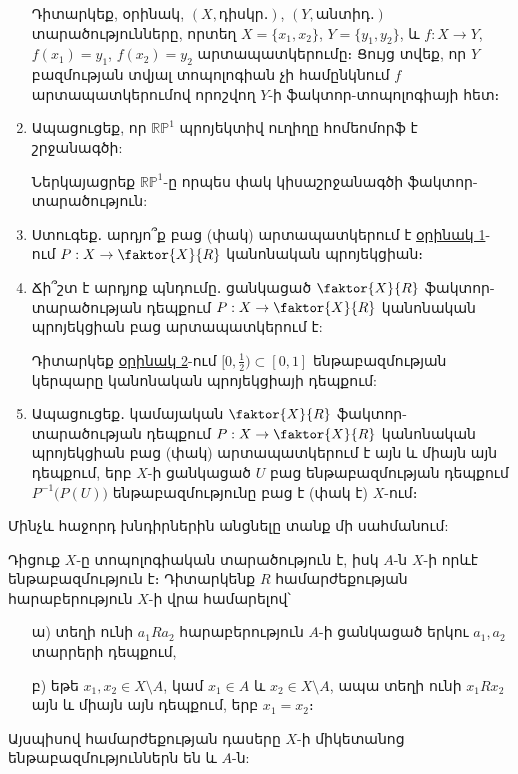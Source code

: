 \begin{enumerate}[label=\thesection.\arabic*., series=probset12]
\begin{hint}
Դիտարկեք, օրինակ, $(X, \text{դիսկր․})$, $(Y, \text{անտիդ․})$ տա\-րա\-ծու\-թյուն\-նե\-րը, որտեղ $X=\{x_1, x_2\}$, $Y=\{y_1, y_2\}$, և ${f: X \to Y}$, ${f(x_1)=y_1}$, ${f(x_2)=y_2}$ արտապատկերումը։ Ցույց տվեք, որ $Y$ բազմության տվյալ տոպոլոգիան չի համընկնում $f$ արտապատկերումով որոշվող $Y$-ի ֆակտոր-տոպոլոգիայի հետ։
\end{hint}

\item Ապացուցեք, որ $\mathbb{RP}^1$ պրոյեկտիվ ուղիղը հոմեոմորֆ է շրջանագծի:

\begin{hint}
Ներկայացրեք $\mathbb{RP}^1$-ը որպես փակ կիսաշրջանագծի ֆակտոր-տա\-րա\-ծություն:
\end{hint}

\item Ստուգեք․ արդյո՞ք բաց (փակ) արտապատկերում է \hyperref[ch12ex1]{օրինակ 1}-ում ${P: X \to \faktor{X}{R}}$ կանոնական պրոյեկցիան։

\item Ճի՞շտ է արդյոք պնդումը․ ցանկացած $\faktor{X}{R}$ ֆակտոր-տարածության դեպքում $P: X \to \faktor{X}{R}$ կանոնական պրոյեկցիան բաց արտապատկերում է:

\begin{hint}
Դիտարկեք \hyperref[ch12ex2]{օրինակ 2}-ում $[0, \frac{1}{2}) \subset [0, 1]$ ենթաբազմության կեր\-պարը կանոնական պրոյեկցիայի դեպքում:
\end{hint}

\item Ապացուցեք․ կամայական $\faktor{X}{R}$ ֆակտոր-տարածության դեպքում ${P: X \to \faktor{X}{R}}$ կանոնական պրոյեկցիան բաց (փակ) արտապատկերում է այն և միայն այն դեպքում, երբ $X$-ի ցանկացած $U$ բաց ենթաբազմության դեպքում $P^{-1}\big(P(U)\big)$ ենթաբազմությունը բաց է (փակ է) $X$-ում։
\end{enumerate}

\par Մինչև հաջորդ խնդիրներին անցնելը տանք մի սահմանում:

\par Դիցուք $X$-ը տոպոլոգիական տարածություն է, իսկ $A$-ն $X$-ի որևէ ենթաբազ\-մու\-թյուն է։ Դիտարկենք $R$ համարժեքության հարաբերություն $X$-ի վրա համարելով՝
\begin{enumerate}
    \item[ա)] տեղի ունի $a_1 R a_2$ հարաբերություն $A$-ի ցանկացած երկու $a_1, a_2$ տարրերի դեպ\-քում,
    \item[բ)] եթե $x_1, x_2 \in X \setminus A$, կամ $x_1 \in A$ և $x_2 \in X \setminus A$, ապա տեղի ունի $x_1 R x_2$ այն \linebreak և միայն այն դեպքում, երբ $x_1 = x_2$։
\end{enumerate}
\par Այսպիսով համարժեքության դասերը $X$-ի միկետանոց ենթաբազմություններն են և $A$-ն:

